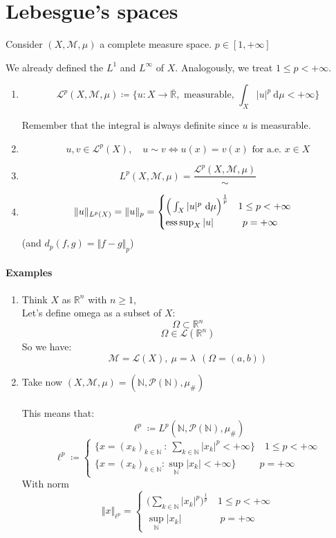 \section{Lebesgue's spaces}
Consider $(X,\mathcal M,\mu)$ a complete measure space. $p\in [1,+\infty]$

We already defined the $L^1$ and $L^\infty$ of $X$. Analogously, we treat $1\leq p<+\infty$.
\begin{enumerate}
    \item $$\mathcal L^p(X,\mathcal M,\mu)\coloneqq \{u:X\to\overline{\mathbb R}, \text{ measurable, } \int_X |u|^p\ \mathrm d\mu<+\infty\}$$
    
    Remember that the integral is always definite since $u$ is measurable.
    \item $$u,v\in \mathcal L^p(X),\quad u\sim v\iff u(x)=v(x) \text{ for a.e. } x\in X$$
    \item $$L^p(X,\mathcal M,\mu)=\frac{\mathcal L^p(X,\mathcal M,\mu)}\sim$$
    \item $$\Vert u\Vert_{L^p(X)}=\Vert u\Vert_p=\begin{cases}\Big (\int_X |u|^p\ \mathrm d\mu \Big )^{\frac{1}{p}}\quad 1\leq p<+\infty\\ \operatorname*{ess\,sup}_X|u|\quad \quad \quad p=+\infty\end{cases}$$
    (and $d_p(f,g)=\Vert f-g\Vert_p$)
\end{enumerate}
\paragraph{Examples}
\begin{enumerate}
    \item Think $X$ as $\mathbb R^n$ with $n\geq 1$,\\
    Let's define omega as a subset of $X$:
    $$\Omega\subset \mathbb R^n$$
$$\Omega \in \mathcal L(\mathbb R^n)$$
So we have:
$$\mathcal M=\mathcal L(X),\ \mu=\lambda \ \ (\Omega =(a,b))$$
\item Take now $(X,\mathcal M,\mu)=(\mathbb N, \mathcal P(\mathbb N), \mu_\#)$\\ \ \\
This means that:
$$\ell^p\coloneqq L^p(\mathbb N, \mathcal P(\mathbb N), \mu_\#)$$
$$\ell^p\coloneqq \begin{cases}
    \Big\{x=(x_k)_{k\in\mathbb N}\ : \ \sum_{k\in \mathbb N}|x_k|^p<+\infty\Big\}\quad 1\leq p<+\infty\\
    \Big\{ x=(x_k)_{k\in \mathbb N}: \sup_{\mathbb N}|x_k|<+\infty\Big\}\quad \quad\ \  p=+\infty
\end{cases}$$
With norm 
$$\Vert x\Vert_{\ell^p}=\begin{cases}
    \Big (\sum_{k\in \mathbb N}|x_k|^p\Big)^{\frac 1p} \quad 1\leq p<+\infty\\
    \sup_{\mathbb N}|x_k| \quad \quad \quad \quad p=+\infty
\end{cases}$$

\end{enumerate}

